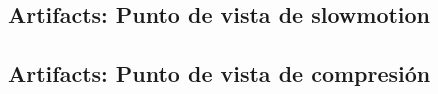 \newpage
\subsection{Artifacts: Punto de vista de slowmotion}

\subsection{Artifacts: Punto de vista de compresión}


